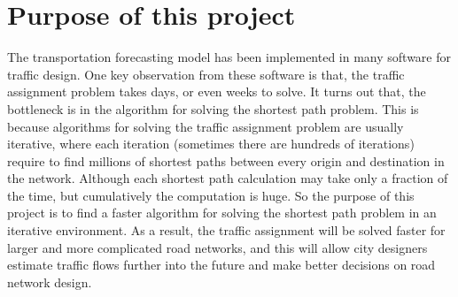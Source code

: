 \begin{comment}
Both of these methods are iterative methods that require shortest path calculations for every trip origins in the network.
It is not difficult to imagine that there would be many shortest path calculations if the network has hundreds of origins and destinations and takes some iterations to solve.
Each shortest path calculation would also be very hard to solve if the network has a few hundred intersections and a few thousand roads for a realistic city road network.
\citet{Sheffi} states that finding the shortest path is the most computation intensive component for the PE or Frank-Wolfe algorithms, 
other components in the algorithms such as updating new values and convergence check only requires a few percentages of the total running time.
Overall, speeding up shortest path calculations would significantly speed up the traffic assignment algorithms.
As a result,
traffic forecasting would be solved faster for larger and more complicated road networks,
which allow city designers predict traffic further into the future and make better decisions on road network design.
\end{comment}

\section{Purpose of this project}
The transportation forecasting model has been implemented in many software for traffic design.
One key observation from these software is that,
the traffic assignment problem takes days, or even weeks to solve.
It turns out that,
the bottleneck is in the algorithm for solving the shortest path problem.
This is because algorithms for solving the traffic assignment problem are usually iterative,
where each iteration (sometimes there are hundreds of iterations) require to find millions of shortest paths between every origin and destination in the network.
Although each shortest path calculation may take only a fraction of the time,
but cumulatively the computation is huge.
So the purpose of this project is to find a faster algorithm for solving the shortest path problem in an iterative environment.
As a result, the traffic assignment will be solved faster
for larger and more complicated road networks,
and this will allow city designers estimate traffic flows further into the future and make better decisions on road network design.

